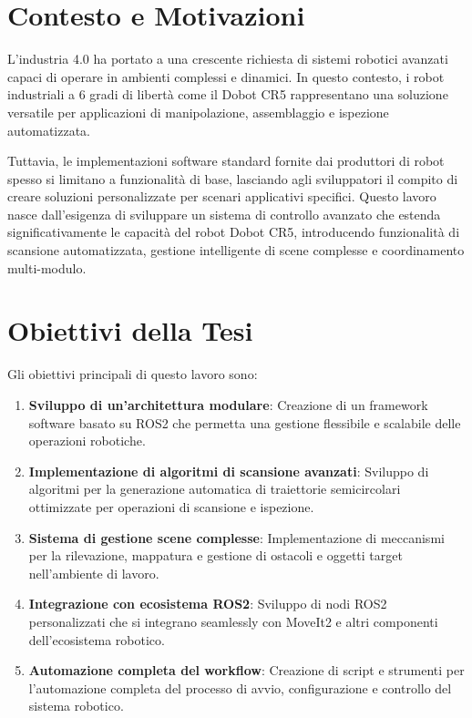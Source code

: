 \documentclass[12pt,a4paper,twoside,openright]{book}
\begin{document}
\section{Contesto e Motivazioni}

L'industria 4.0 ha portato a una crescente richiesta di sistemi robotici avanzati capaci di operare in ambienti complessi e dinamici. In questo contesto, i robot industriali a 6 gradi di libertà come il Dobot CR5 rappresentano una soluzione versatile per applicazioni di manipolazione, assemblaggio e ispezione automatizzata.

Tuttavia, le implementazioni software standard fornite dai produttori di robot spesso si limitano a funzionalità di base, lasciando agli sviluppatori il compito di creare soluzioni personalizzate per scenari applicativi specifici. Questo lavoro nasce dall'esigenza di sviluppare un sistema di controllo avanzato che estenda significativamente le capacità del robot Dobot CR5, introducendo funzionalità di scansione automatizzata, gestione intelligente di scene complesse e coordinamento multi-modulo.

\section{Obiettivi della Tesi}

Gli obiettivi principali di questo lavoro sono:

\begin{enumerate}
    \item \textbf{Sviluppo di un'architettura modulare}: Creazione di un framework software basato su ROS2 che permetta una gestione flessibile e scalabile delle operazioni robotiche.
    
    \item \textbf{Implementazione di algoritmi di scansione avanzati}: Sviluppo di algoritmi per la generazione automatica di traiettorie semicircolari ottimizzate per operazioni di scansione e ispezione.
    
    \item \textbf{Sistema di gestione scene complesse}: Implementazione di meccanismi per la rilevazione, mappatura e gestione di ostacoli e oggetti target nell'ambiente di lavoro.
    
    \item \textbf{Integrazione con ecosistema ROS2}: Sviluppo di nodi ROS2 personalizzati che si integrano seamlessly con MoveIt2 e altri componenti dell'ecosistema robotico.
    
    \item \textbf{Automazione completa del workflow}: Creazione di script e strumenti per l'automazione completa del processo di avvio, configurazione e controllo del sistema robotico.
\end{enumerate}
\end{document}
